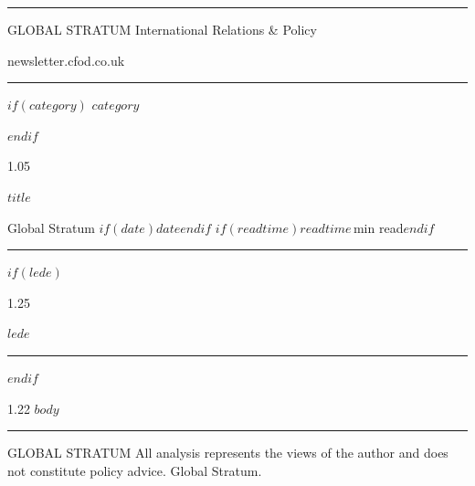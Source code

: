 \documentclass[12pt,a4paper]{article}
\begin{document}
\thispagestyle{empty}

\noindent\textcolor{gsAccent}{\rule{\linewidth}{2.5pt}}
\vspace{0.4em}

\noindent
\begin{minipage}[c]{0.65\linewidth}
  {\fontsize{7.5}{10}\selectfont\sffamily\color{gsMuted}%
  \MakeUppercase{Global Stratum}\enspace\textperiodcentered\enspace
  International Relations \& Policy}
\end{minipage}%
\hfill
\begin{minipage}[c]{0.33\linewidth}
  \raggedleft
  {\fontsize{7.5}{10}\selectfont\sffamily\color{gsMuted}newsletter.cfod.co.uk}
\end{minipage}

\vspace{0.6em}
\noindent\textcolor{gsAccent!30}{\rule{\linewidth}{0.5pt}}
\vspace{2em}

$if(category)$
{\fontsize{8.5}{11}\selectfont\sffamily\bfseries\textcolor{gsAccent}{\MakeUppercase{$category$}}}
\vspace{0.65em}

$endif$
\begin{spacing}{1.05}
{\fontsize{28}{33}\selectfont\bfseries $title$\par}
\end{spacing}

\vspace{0.8em}

{\fontsize{8.5}{11}\selectfont\sffamily\color{gsMuted}%
Global Stratum%
$if(date)$\enspace\textperiodcentered\enspace $date$$endif$%
$if(readtime)$\enspace\textperiodcentered\enspace $readtime$\,min read$endif$}

\vspace{0.9em}
\noindent\textcolor{gsAccent!40}{\rule{\linewidth}{0.5pt}}
\vspace{1.25em}

$if(lede)$
\begin{spacing}{1.25}
{\large\itshape $lede$\par}
\end{spacing}
\vspace{0.9em}
\noindent\textcolor{gsMuted!40}{\rule{\linewidth}{0.4pt}}
\vspace{1em}

$endif$
\begin{spacing}{1.22}
$body$
\end{spacing}

\vspace{2.5em}
\noindent\textcolor{gsAccent!30}{\rule{\linewidth}{0.5pt}}
\vspace{0.4em}

{\fontsize{7}{9}\selectfont\sffamily\color{gsMuted}%
\MakeUppercase{Global Stratum}\enspace\textperiodcentered\enspace
All analysis represents the views of the author and does not constitute policy advice.\enspace
\textcopyright\enspace Global Stratum.}
\end{document}
